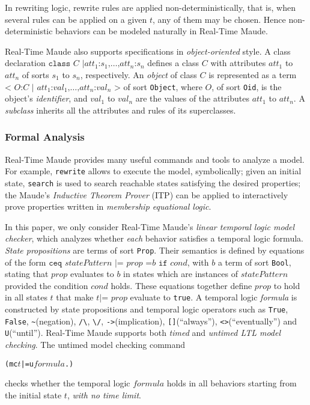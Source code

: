 \documentclass{llncs}
\begin{document}
In rewriting logic, rewrite rules are applied non-deterministically,
that is, when several rules can be applied on a given $t$, any of them
may be chosen. Hence non-deterministic behaviors can be modeled
naturally in Real-Time Maude.

Real-Time Maude also supports specifications in \emph{object-oriented}
style.  A class declaration $\texttt{class }C\texttt{ |
}att_1\texttt{:}s_1\texttt{,}\ldots\texttt{,}att_n\texttt{:}s_n$
defines a class $C$ with attributes $att_1$ to $att_n$ of sorts $s_1$
to $s_n$, respectively. An \emph{object} of class $C$ is represented
as a term $\texttt{< } O\texttt{:} C \texttt{ | }
att_1\texttt{:}val_1\texttt{,} \ldots
\texttt{,}att_n\texttt{:}val_n\texttt{ >}$ of sort \verb|Object|,
where $O$, of sort \verb|Oid|, is the object's \emph{identifier}, and
$val_1$ to $val_n$ are the values of the attributes $att_1$ to
$att_n$. A \emph{subclass} inherits all the attributes and rules of
its superclasses.

\subsubsection{Formal Analysis}
Real-Time Maude provides many useful commands and tools to analyze a
model. For example, \verb|rewrite| allows to execute the model,
symbolically; given an initial state, \verb|search| is used to search
reachable states satisfying the desired properties; the Maude's
\emph{Inductive Theorem Prover} (ITP) can be applied to interactively
prove properties written in \emph{membership equational logic}. 

In this paper, we only consider Real-Time Maude's \emph{linear
  temporal logic model checker}, which analyzes whether \emph{each}
behavior satisfies a temporal logic formula. \emph{State propositions}
are terms of sort \verb|Prop|. Their semantics is defined by equations
of the form $\texttt{ceq } statePattern \texttt{ |= } prop \texttt{ =
} b \texttt{ if } cond$, with $b$ a term of sort \verb|Bool|, stating
that $prop$ evaluates to $b$ in states which are instances of
$statePattern$ provided the condition $cond$ holds. These equations
together define $prop$ to hold in all states $t$ that make $t \texttt{
  |= } prop$ evaluate to \verb|true|. A temporal logic \emph{formula}
is constructed by state propositions and temporal logic operators such
as \verb|True|, \verb|False|, \verb|~|(negation), \verb|/\|,
\verb|\/|, \verb|->|(implication), \verb|[]|(``always''),
\verb|<>|(``eventually'') and \verb|U|(``until''). Real-Time Maude
supports both \emph{timed} and \emph{untimed LTL model checking}. The
untimed model checking command
\begin{alltt}
  (mc \(t\) |=u \(formula\) .)
\end{alltt}
checks whether the temporal logic $formula$ holds in all behaviors
starting from the initial state $t$, \emph{with no time limit}.
\end{document}
